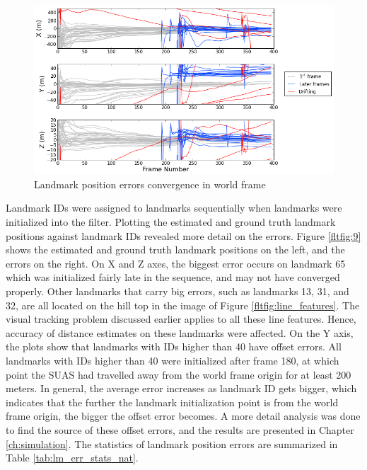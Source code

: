 \begin{figure}[h]
\centering
\includegraphics[width=14cm, keepaspectratio=true]
{./Figures/fltfig/cut1/Figure500.png}
\caption{Landmark position errors convergence in world frame}
\label{fltfig:8}
\end{figure}

Landmark IDs were assigned to landmarks sequentially when landmarks
were initialized into the filter. Plotting the estimated and ground
truth landmark positions against landmark IDs revealed more detail on
the errors. Figure \ref{fltfig:9} shows the estimated and ground truth
landmark positions on the left, and the errors on the right. On X and
Z axes, the biggest error occurs on landmark 65 which was initialized
fairly late in the sequence, and may not have converged properly.
Other landmarks that carry big errors, such as landmarks 13, 31, and
32, are all located on the hill top in the image of Figure
\ref{fltfig:line_features}. The visual tracking problem discussed
earlier applies to all these line features. Hence, accuracy of
distance estimates on these landmarks were affected. On the Y axis,
the plots show that landmarks with IDs higher than 40 have offset
errors. All landmarks with IDs higher than 40 were initialized after
frame 180, at which point the SUAS had travelled away from the world
frame origin for at least 200 meters. In general, the average error
increases as landmark ID gets bigger, which indicates that the further
the landmark initialization point is from the world frame origin, the
bigger the offset error becomes. A more detail analysis was done to
find the source of these offset errors, and the results are presented
in Chapter \ref{ch:simulation}. The statistics of landmark position
errors are summarized in Table \ref{tab:lm_err_stats_nat}.

